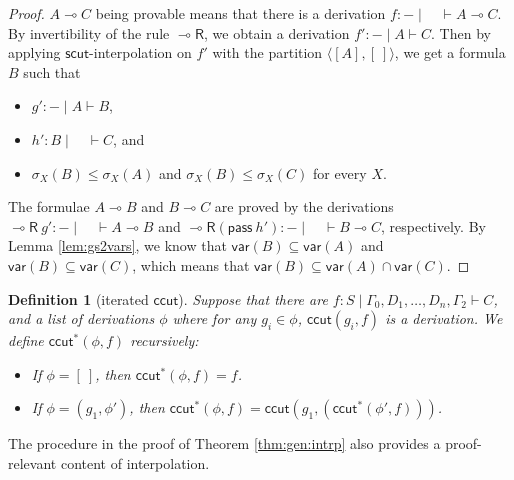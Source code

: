 \documentclass[sn-mathphys-num]{sn-jnl}%
\newcommand{\GG}{\Gamma}
\newcommand{\vd}{\vdash}
\newcommand{\pass}{\mathsf{pass}}
\newcommand{\lolli}{\multimap}
\newcommand{\lleft}{{\lolli}\mathsf{L}}
\newcommand{\lright}{{\lolli}\mathsf{R}}
\newcommand{\mf}[1]{\mathsf{#1}}
\newcommand{\gs}[1]{\sigma_{X} (#1)}
\newcommand{\vars}[1]{\mf{var} (#1)}
\theoremstyle{thmstyleone}%
\theoremstyle{thmstyletwo}%
\theoremstyle{thmstylethree}%
\newtheorem{definition}[theorem]{Definition}%
\begin{document}
\begin{proof}
$A \lolli C$ being provable means that there is a derivation $f : {-} \mid \quad \vd A \lolli C$. 
By invertibility of the rule $\lright$, we obtain a derivation $f' : {-} \mid A \vd C$.
Then by applying $\mf{scut}$-interpolation on $f'$ with the partition $\langle [A ], [\ ]\rangle$, we get a formula $B$ such that 
\begin{itemize}
  \item[--] $g': {-} \mid A \vd B$,
  \item[--] $h': B \mid \quad \vd C$, and 
  \item[--] $\gs{B} \leq \gs{A} $ and $ \gs{B} \leq \gs{C}$ for every $X$.
\end{itemize}
The formulae $A \lolli B$ and $B \lolli C$ are proved by the derivations $\lright \ g' : {-} \mid \quad \vd A \lolli B$ and $\lright (\pass \ h') : {-} \mid \quad \vd B \lolli C$, respectively.
By Lemma \ref{lem:gs2vars}, we know that $\vars{B} \subseteq \vars{A}$ and $\vars{B} \subseteq \vars{C}$, which means that $\vars{B} \subseteq \vars{A} \cap \vars{C}$.
\end{proof}
\begin{definition}[iterated $\mf{ccut}$]
  Suppose that there are $f : S \mid \GG_0 , D_1 , \dots, D_n , \GG_2 \vd C$, and a list of derivations $\phi$ where for any $g_i \in \phi$, $\mf{ccut}(g_i , f)$ is a derivation. 
  We define $\mf{ccut}^* (\phi , f)$ recursively:
  \begin{itemize}
    \item[--] If $\phi = [\ ]$, then $\mf{ccut}^* (\phi , f) = f$.
    \item[--] If $\phi = (g_1 , \phi')$, then $\mf{ccut}^* (\phi , f) = \mf{ccut} (g_1 , (\mf{ccut}^* (\phi' , f)))$.
  \end{itemize}
\end{definition}
The procedure in the proof of Theorem \ref{thm:gen:intrp} also provides a proof-relevant content of interpolation.
\end{document}
